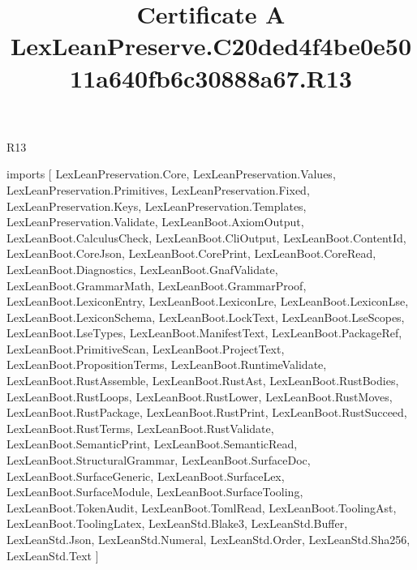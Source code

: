 \begin{lexlean}{R13}
\title{Certificate A LexLeanPreserve.C20ded4f4be0e5011a640fb6c30888a67.R13}
\begin{coremodule}
imports [
  LexLeanPreservation.Core,
  LexLeanPreservation.Values,
  LexLeanPreservation.Primitives,
  LexLeanPreservation.Fixed,
  LexLeanPreservation.Keys,
  LexLeanPreservation.Templates,
  LexLeanPreservation.Validate,
  LexLeanBoot.AxiomOutput,
  LexLeanBoot.CalculusCheck,
  LexLeanBoot.CliOutput,
  LexLeanBoot.ContentId,
  LexLeanBoot.CoreJson,
  LexLeanBoot.CorePrint,
  LexLeanBoot.CoreRead,
  LexLeanBoot.Diagnostics,
  LexLeanBoot.GnafValidate,
  LexLeanBoot.GrammarMath,
  LexLeanBoot.GrammarProof,
  LexLeanBoot.LexiconEntry,
  LexLeanBoot.LexiconLre,
  LexLeanBoot.LexiconLse,
  LexLeanBoot.LexiconSchema,
  LexLeanBoot.LockText,
  LexLeanBoot.LseScopes,
  LexLeanBoot.LseTypes,
  LexLeanBoot.ManifestText,
  LexLeanBoot.PackageRef,
  LexLeanBoot.PrimitiveScan,
  LexLeanBoot.ProjectText,
  LexLeanBoot.PropositionTerms,
  LexLeanBoot.RuntimeValidate,
  LexLeanBoot.RustAssemble,
  LexLeanBoot.RustAst,
  LexLeanBoot.RustBodies,
  LexLeanBoot.RustLoops,
  LexLeanBoot.RustLower,
  LexLeanBoot.RustMoves,
  LexLeanBoot.RustPackage,
  LexLeanBoot.RustPrint,
  LexLeanBoot.RustSucceed,
  LexLeanBoot.RustTerms,
  LexLeanBoot.RustValidate,
  LexLeanBoot.SemanticPrint,
  LexLeanBoot.SemanticRead,
  LexLeanBoot.StructuralGrammar,
  LexLeanBoot.SurfaceDoc,
  LexLeanBoot.SurfaceGeneric,
  LexLeanBoot.SurfaceLex,
  LexLeanBoot.SurfaceModule,
  LexLeanBoot.SurfaceTooling,
  LexLeanBoot.TokenAudit,
  LexLeanBoot.TomlRead,
  LexLeanBoot.ToolingAst,
  LexLeanBoot.ToolingLatex,
  LexLeanStd.Blake3,
  LexLeanStd.Buffer,
  LexLeanStd.Json,
  LexLeanStd.Numeral,
  LexLeanStd.Order,
  LexLeanStd.Sha256,
  LexLeanStd.Text
]


\end{coremodule}
\end{lexlean}
